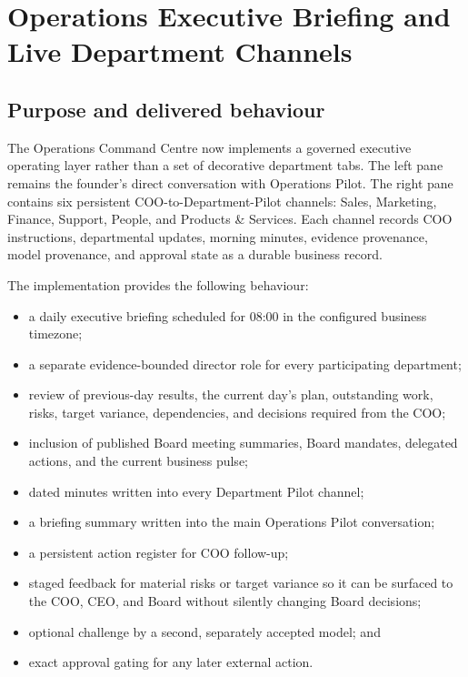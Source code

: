 \section{Operations Executive Briefing and Live Department Channels}
\label{sec:pilot-operations-executive-briefing}
\raggedright

\subsection{Purpose and delivered behaviour}

The Operations Command Centre now implements a governed executive operating layer rather than a
set of decorative department tabs.  The left pane remains the founder's direct conversation with
Operations Pilot.  The right pane contains six persistent COO-to-Department-Pilot channels:
Sales, Marketing, Finance, Support, People, and Products \& Services.  Each channel records COO
instructions, departmental updates, morning minutes, evidence provenance, model provenance, and
approval state as a durable business record.

The implementation provides the following behaviour:
\begin{itemize}[leftmargin=*]
\item a daily executive briefing scheduled for 08:00 in the configured business timezone;
\item a separate evidence-bounded director role for every participating department;
\item review of previous-day results, the current day's plan, outstanding work, risks, target
      variance, dependencies, and decisions required from the COO;
\item inclusion of published Board meeting summaries, Board mandates, delegated actions, and the
      current business pulse;
\item dated minutes written into every Department Pilot channel;
\item a briefing summary written into the main Operations Pilot conversation;
\item a persistent action register for COO follow-up;
\item staged feedback for material risks or target variance so it can be surfaced to the COO,
      CEO, and Board without silently changing Board decisions;
\item optional challenge by a second, separately accepted model; and
\item exact approval gating for any later external action.
\end{itemize}

